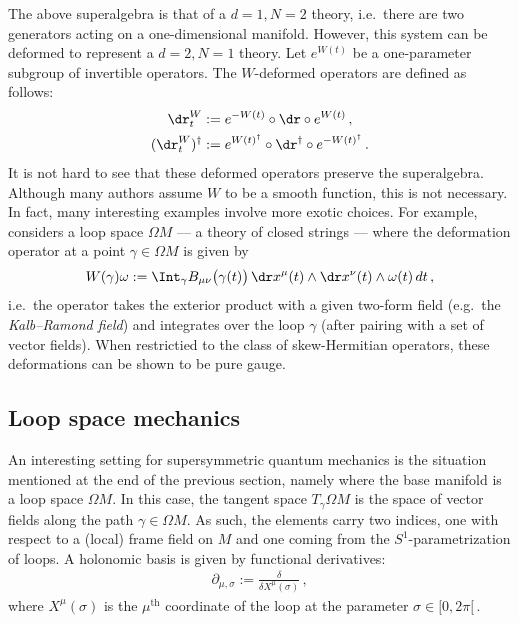    The above superalgebra is that of a $d=1,N=2$ theory, i.e.~there are two generators acting on a one-dimensional manifold. However, this system can be deformed to represent a $d=2,N=1$ theory. Let $e^{W(t)}$ be a one-parameter subgroup of invertible operators. The $W$-deformed operators are defined as follows:
    \begin{gather}
        \begin{aligned}
            \dr_t^W &:= e^{-W(t)}\circ\dr\circ e^{W(t)}\,,\\
            (\dr_t^W)^\dagger &:= e^{W(t)^\dagger}\circ\dr^\dagger\circ e^{-W(t)^\dagger}\,.
        \end{aligned}
    \end{gather}
    It is not hard to see that these deformed operators preserve the superalgebra. Although many authors assume $W$ to be a smooth function, this is not necessary. In fact, many interesting examples involve more exotic choices. For example, \citet{schreiber_loop_2005} considers a loop space $\Omega M$ --- a theory of closed strings --- where the deformation operator at a point $\gamma\in\Omega M$ is given by
    \begin{gather}
        W(\gamma)\omega := \Int_\gamma B_{\mu\nu}\bigl(\gamma(t)\bigr)\,\dr x^\mu(t)\wedge\dr x^\nu(t)\wedge\omega(t)\,dt\,,
    \end{gather}
    i.e.~the operator takes the exterior product with a given two-form field (e.g.~the \textit{Kalb--Ramond field}) and integrates over the loop $\gamma$ (after pairing with a set of vector fields). When restrictied to the class of skew-Hermitian operators, these deformations can be shown to be pure gauge.


\subsection{Loop space mechanics}

    An interesting setting for supersymmetric quantum mechanics is the situation mentioned at the end of the previous section, namely where the base manifold is a loop space $\Omega M$. In this case, the tangent space $T_\gamma\Omega M$ is the space of vector fields along the path $\gamma\in\Omega M$. As such, the elements carry two indices, one with respect to a (local) frame field on $M$ and one coming from the $S^1$-parametrization of loops. A holonomic basis is given by functional derivatives:
    \begin{gather}
        \partial_{\mu,\sigma} := \frac{\delta}{\delta X^\mu(\sigma)}\,,
    \end{gather}
    where $X^\mu(\sigma)$ is the $\mu^{\text{th}}$ coordinate of the loop at the parameter $\sigma\in[0,2\pi[\,$.

